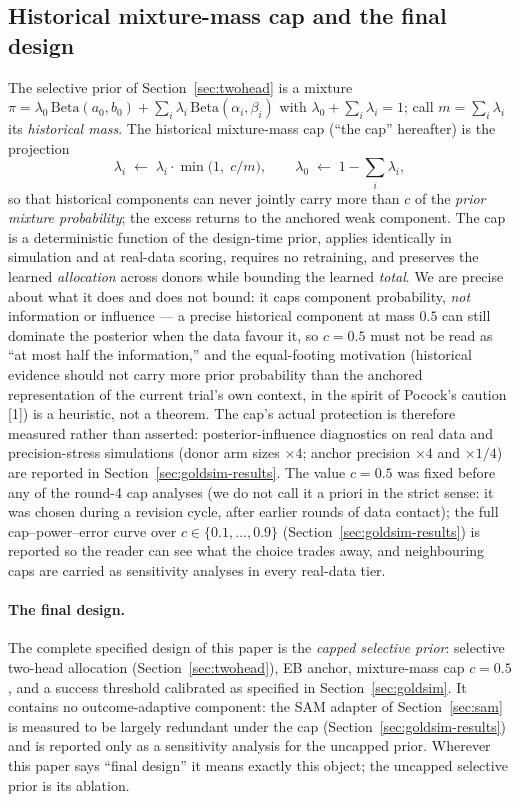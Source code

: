 \documentclass[11pt]{article}
\begin{document}
\subsection{Historical mixture-mass cap and the final design}
\label{sec:cap}
The selective prior of Section~\ref{sec:twohead} is a mixture
$\pi = \lambda_0\,\mathrm{Beta}(a_0,b_0) + \sum_i \lambda_i\,
\mathrm{Beta}(\alpha_i,\beta_i)$ with $\lambda_0 + \sum_i \lambda_i = 1$;
call $m = \sum_i \lambda_i$ its \emph{historical mass}. The historical
mixture-mass cap (``the cap'' hereafter) is the projection
\[
  \lambda_i \;\leftarrow\; \lambda_i \cdot \min\!\big(1,\; c/m\big),
  \qquad
  \lambda_0 \;\leftarrow\; 1 - \textstyle\sum_i \lambda_i ,
\]
so that historical components can never jointly carry more than $c$ of the
\emph{prior mixture probability}; the excess returns to the anchored weak
component. The cap is a
deterministic function of the design-time prior, applies identically in
simulation and at real-data scoring, requires no retraining, and preserves
the learned \emph{allocation} across donors while bounding the learned
\emph{total}. We are precise about what it does and does not bound: it caps
component probability, \emph{not} information or influence --- a precise
historical component at mass $0.5$ can still dominate the posterior when
the data favour it, so $c = 0.5$ must not be read as ``at most half the
information,'' and the equal-footing motivation (historical evidence
should not carry more prior probability than the anchored representation
of the current trial's own context, in the spirit of Pocock's caution
[1]) is a heuristic, not a theorem. The cap's actual protection is
therefore measured rather than asserted: posterior-influence diagnostics
on real data and precision-stress simulations (donor arm sizes $\times 4$;
anchor precision $\times 4$ and $\times 1/4$) are reported in
Section~\ref{sec:goldsim-results}. The value $c = 0.5$ was fixed before
any of the round-4 cap analyses (we do not call it a priori in the strict
sense: it was chosen during a revision cycle, after earlier rounds of data
contact); the full cap--power--error curve over $c \in \{0.1,\dots,0.9\}$
(Section~\ref{sec:goldsim-results}) is reported so the reader can see what
the choice trades away, and neighbouring caps are carried as sensitivity
analyses in every real-data tier.

\paragraph{The final design.} The complete specified design of this paper is
the \emph{capped selective prior}: selective two-head allocation
(Section~\ref{sec:twohead}), EB anchor, mixture-mass cap $c = 0.5$, and a
success threshold calibrated as specified in
Section~\ref{sec:goldsim}. It contains no outcome-adaptive component:
the SAM adapter of Section~\ref{sec:sam} is measured to be largely redundant
under the cap (Section~\ref{sec:goldsim-results}) and is reported only as a
sensitivity analysis for the uncapped prior. Wherever this paper says
``final design'' it means exactly this object; the uncapped selective prior
is its ablation.
\end{document}
